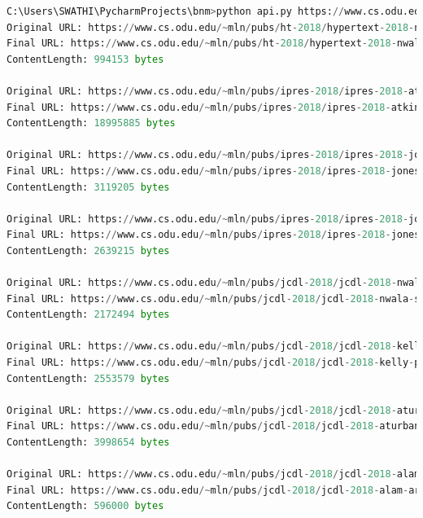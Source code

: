\documentclass[12pt]{article}
\begin{document}
\begin{lstlisting}[language=Python, caption=Python code, label=lst:copy]
C:\Users\SWATHI\PycharmProjects\bnm>python api.py https://www.cs.odu.edu/~mweigle/courses/cs532/pdfs.html
Original URL: https://www.cs.odu.edu/~mln/pubs/ht-2018/hypertext-2018-nwala-bootstrapping.pdf
Final URL: https://www.cs.odu.edu/~mln/pubs/ht-2018/hypertext-2018-nwala-bootstrapping.pdf
ContentLength: 994153 bytes

Original URL: https://www.cs.odu.edu/~mln/pubs/ipres-2018/ipres-2018-atkins-news-similarity.pdf
Final URL: https://www.cs.odu.edu/~mln/pubs/ipres-2018/ipres-2018-atkins-news-similarity.pdf
ContentLength: 18995885 bytes

Original URL: https://www.cs.odu.edu/~mln/pubs/ipres-2018/ipres-2018-jones-off-topic.pdf
Final URL: https://www.cs.odu.edu/~mln/pubs/ipres-2018/ipres-2018-jones-off-topic.pdf
ContentLength: 3119205 bytes

Original URL: https://www.cs.odu.edu/~mln/pubs/ipres-2018/ipres-2018-jones-archiveit.pdf
Final URL: https://www.cs.odu.edu/~mln/pubs/ipres-2018/ipres-2018-jones-archiveit.pdf
ContentLength: 2639215 bytes

Original URL: https://www.cs.odu.edu/~mln/pubs/jcdl-2018/jcdl-2018-nwala-scraping-serps-seeds.pdf
Final URL: https://www.cs.odu.edu/~mln/pubs/jcdl-2018/jcdl-2018-nwala-scraping-serps-seeds.pdf
ContentLength: 2172494 bytes

Original URL: https://www.cs.odu.edu/~mln/pubs/jcdl-2018/jcdl-2018-kelly-private-public-web-archives.pdf
Final URL: https://www.cs.odu.edu/~mln/pubs/jcdl-2018/jcdl-2018-kelly-private-public-web-archives.pdf
ContentLength: 2553579 bytes

Original URL: https://www.cs.odu.edu/~mln/pubs/jcdl-2018/jcdl-2018-aturban-archivenow.pdf
Final URL: https://www.cs.odu.edu/~mln/pubs/jcdl-2018/jcdl-2018-aturban-archivenow.pdf
ContentLength: 3998654 bytes

Original URL: https://www.cs.odu.edu/~mln/pubs/jcdl-2018/jcdl-2018-alam-archive-banner.pdf
Final URL: https://www.cs.odu.edu/~mln/pubs/jcdl-2018/jcdl-2018-alam-archive-banner.pdf
ContentLength: 596000 bytes




\end{lstlisting}
\end{document}
